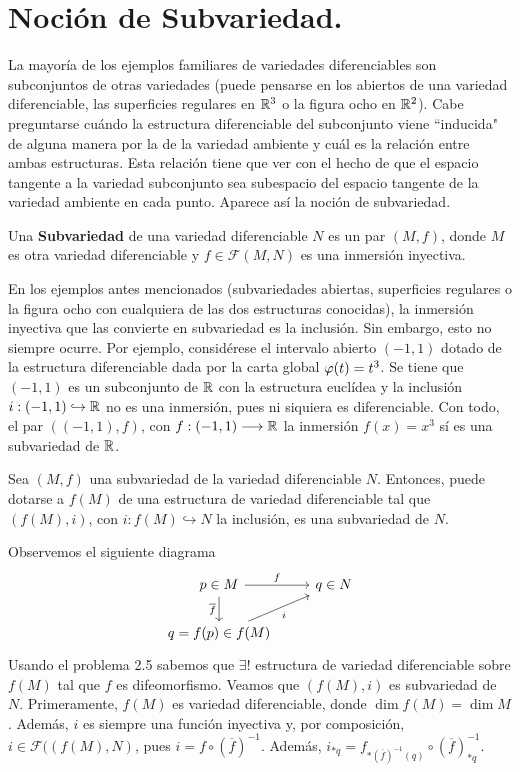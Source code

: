 \documentclass[Cursovd_portada.tex]{subfiles}
\begin{document}
\section{Noción de Subvariedad.}
\hs La mayoría de los ejemplos familiares de variedades
diferenciables son subconjuntos de otras variedades (puede
pensarse en los abiertos de una variedad diferenciable, las
superficies re\-gu\-la\-res en $\mathbb{R}^3$ o la figura ocho en $\mathbb{R}^2$).
Cabe preguntarse cuándo la estructura diferenciable del
subconjunto viene ``inducida" de alguna manera por la de la
variedad ambiente y cuál es la relación entre ambas
estructuras. Esta relación tiene que ver con el hecho de que
el espacio tangente a la variedad subconjunto sea subespacio del
espacio tangente de la variedad ambiente en cada punto. Aparece
así la noción de subvariedad.
\begin{defi}
Una {\bf Subvariedad} de una variedad diferenciable $N$ es un par $(M,f)$, donde $M$ es otra variedad
diferenciable y $f\in\mathcal{F}(M,N)$ es una inmersión inyectiva.
\end{defi}
En los ejemplos antes mencionados (subvariedades abiertas,
superficies re\-gu\-la\-res o la figura ocho con cualquiera de las
dos estructuras conocidas), la inmersión inyectiva que las
convierte en subvariedad es la inclusión. Sin embargo, esto no
siempre ocurre. Por ejemplo, considérese el intervalo abierto
$(-1,1)$ dotado de la estructura diferenciable dada por la carta
global $\varphi(t)=t^3$. Se tiene que $(-1,1)$ es un subconjunto de
$\mathbb{R}$ con la estructura euclídea y la inclusión
$i:(-1,1)\hookrightarrow\mathbb{R}$ no es una inmersión, pues ni
siquiera es diferenciable. Con todo, el par $((-1,1),f)$, con
$f:(-1,1)\longrightarrow\mathbb{R}$ la inmersión $f(x)=x^3$ sí es una
subvariedad de $\mathbb{R}$.
\begin{prop}\label{prop}
Sea $(M,f)$ una subvariedad de la variedad diferenciable $N$.
Entonces, puede dotarse a $f(M)$ de una estructura de variedad
diferenciable tal que $(f(M),i)$, con $i:f(M)\hookrightarrow N$ la
inclusión, es una subvariedad de $N$.
\end{prop}
\begin{dem} Observemos el siguiente diagrama
\[
\begin{tikzcd}
p\in M\arrow[r,"f"]\arrow[d,"\overline{f}"'] & q\in N\\
q=f(p)\in f(M)\arrow[ur,"i"'] 
\end{tikzcd}
\]
Usando el problema 2.5 sabemos que $\exists!$ estructura de variedad diferenciable sobre $f(M)$ tal que $f$ es difeomorfismo. Veamos que $(f(M),i)$ es subvariedad de $N$. Primeramente, $f(M)$ es variedad diferenciable, donde $\dim f(M)=\dim M$. Además, $i$ es siempre una función inyectiva y, por composición, $i\in \mathcal{F}((f(M),N)$, pues $ i = f \circ (\overline{f})^{-1}$. Además, $i_{\ast q} = f_{\ast (\overline{f})^{-1}(q)}\circ (\overline{f})^{-1}_{\ast q}$.

\end{dem}
\end{document}
